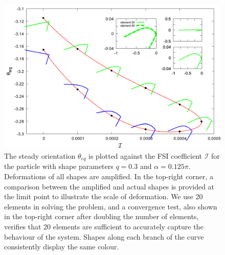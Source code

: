 \documentclass[12pt,MSc,twoside]{muthesis_2020}
\begin{document}
	\begin{figure}[!h]
	\begin{center}
		\includegraphics[width=1\textwidth]{plot/combine_elastic_beam_I_theta_q_0.30_alpha_0.125pi_initial_-4.80_0.png}
		\caption{The steady orientation $\theta_{eq}$ is plotted against the FSI coefficient $\mathcal{I}$ for the particle with shape parameters $q = 0.3$ and $\alpha = 0.125\pi$. Deformations of all shapes are amplified. In the top-right corner, a comparison between the amplified and actual shapes is provided at the limit point to illustrate the scale of deformation. We use 20 elements in solving the problem, and a convergence test, also shown in the top-right corner after doubling the number of elements, verifies that 20 elements are sufficient to accurately capture the behaviour of the system. Shapes along each branch of the curve consistently display the same colour.}
    \label{fig:7}
	\end{center}
\end{figure}
\end{document}
